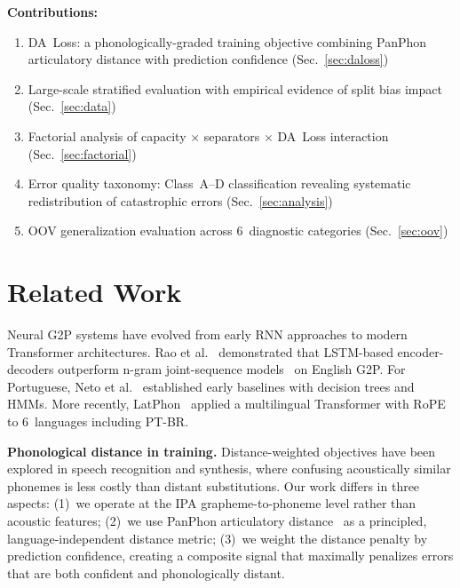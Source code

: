 \documentclass[conference]{IEEEtran}
\begin{document}
\textbf{Contributions:}
\begin{enumerate}
  \item DA~Loss: a phonologically-graded training objective combining
        PanPhon articulatory distance with prediction confidence
        (Sec.~\ref{sec:daloss})
  \item Large-scale stratified evaluation with empirical evidence of
        split bias impact (Sec.~\ref{sec:data})
  \item Factorial analysis of capacity $\times$ separators $\times$
        DA~Loss interaction (Sec.~\ref{sec:factorial})
  \item Error quality taxonomy: Class~A--D classification revealing
        systematic redistribution of catastrophic errors
        (Sec.~\ref{sec:analysis})
  \item OOV generalization evaluation across 6~diagnostic categories
        (Sec.~\ref{sec:oov})
\end{enumerate}

\section{Related Work}
\label{sec:related}

Neural G2P systems have evolved from early RNN approaches to modern
Transformer architectures.
Rao et al.~\cite{rao2015g2p} demonstrated that LSTM-based
encoder-decoders outperform n-gram joint-sequence
models~\cite{bisani2008joint} on English G2P.
For Portuguese, Neto et al.~\cite{neto2006brazilian} established
early baselines with decision trees and HMMs.
More recently, LatPhon~\cite{chary2025latphon} applied a
multilingual Transformer with RoPE to 6~languages including PT-BR.

\textbf{Phonological distance in training.}
Distance-weighted objectives have been explored in speech
recognition and synthesis, where confusing acoustically similar
phonemes is less costly than distant substitutions.
Our work differs in three aspects: (1)~we operate at the IPA
grapheme-to-phoneme level rather than acoustic features;
(2)~we use PanPhon articulatory distance~\cite{mortensen2016panphon}
as a principled, language-independent distance metric;
(3)~we weight the distance penalty by prediction confidence,
creating a composite signal that maximally penalizes errors that are
both confident and phonologically distant.
\end{document}
